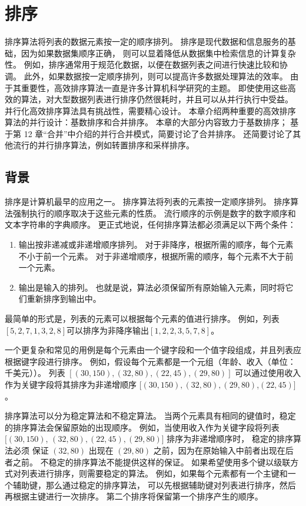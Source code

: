 \section{排序}
排序算法将列表的数据元素按一定的顺序排列。 排序是现代数据和信息服务的基础，因为如果数据集顺序正确，
则可以显着降低从数据集中检索信息的计算复杂性。 例如，排序通常用于规范化数据，以便在数据列表之间进行快速比较和协调。 
此外，如果数据按一定顺序排列，则可以提高许多数据处理算法的效率。 
由于其重要性，高效排序算法一直是许多计算机科学研究的主题。 
即使使用这些高效的算法，对大型数据列表进行排序仍然很耗时，并且可以从并行执行中受益。 
并行化高效排序算法具有挑战性，需要精心设计。 本章介绍两种重要的高效排序算法的并行设计：基数排序和合并排序。 
本章的大部分内容致力于基数排序； 基于第 12 章“合并”中介绍的并行合并模式，简要讨论了合并排序。 
还简要讨论了其他流行的并行排序算法，例如转置排序和采样排序。

\subsection{背景}
排序是计算机最早的应用之一。 排序算法将列表的元素按一定顺序排列。 排序算法强制执行的顺序取决于这些元素的性质。 
流行顺序的示例是数字的数字顺序和文本字符串的字典顺序。 更正式地说，任何排序算法都必须满足以下两个条件：
\begin{enumerate}
   \item 输出按非递减或非递增顺序排列。 对于非降序，根据所需的顺序，每个元素不小于前一个元素。 
   		对于非递增顺序，根据所需的顺序，每个元素不大于前一个元素。

   \item 输出是输入的排列。 也就是说，算法必须保留所有原始输入元素，同时将它们重新排序到输出中。
\end{enumerate}

最简单的形式是，列表的元素可以根据每个元素的值进行排序。 例如，列表$[5,2,7,1,3,2,8]$可以排序为非降序输出$[1,2,2,3,5,7,8]$。

一个更复杂和常见的用例是每个元素由一个键字段和一个值字段组成，并且列表应根据键字段进行排序。 
例如，假设每个元素都是一个元组（年龄、收入（单位：千美元））。 
列表 $[(30,150),(32,80),(22,45),(29,80)]$ 可以通过使用收入
作为关键字段将其排序为非递增顺序 $[(30,150),(32 ,80),(29,80)$,$(22,45)]$。

排序算法可以分为稳定算法和不稳定算法。 当两个元素具有相同的键值时，稳定的排序算法会保留原始的出现顺序。 
例如，当使用收入作为关键字段将列表 $[(30,150)$, $(32,80),(22,45),(29,80)]$ 排序为非递增顺序时，
稳定的排序算法必须 保证 $(32,80)$ 出现在 $(29,80)$ 之前，因为在原始输入中前者出现在后者之前。 
不稳定的排序算法不能提供这样的保证。 如果希望使用多个键以级联方式对列表进行排序，则需要稳定的算法。 
例如，如果每个元素都有一个主键和一个辅助键，那么通过稳定的排序算法，
可以先根据辅助键对列表进行排序，然后再根据主键进行一次排序。 第二个排序将保留第一个排序产生的顺序。

